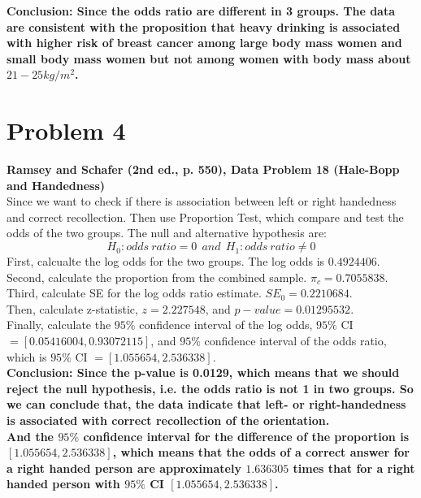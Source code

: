 \documentclass[10pt,letterpaper]{article}
\begin{document}
\textbf{Conclusion: Since the odds ratio are different in 3 groups. The data are consistent with the proposition that heavy drinking is associated with higher risk of breast cancer among large body mass women and small body mass women but not among women with body mass about $21-25 kg/m^2$.}

\section*{Problem 4}
\textbf{Ramsey and Schafer (2nd ed., p. 550), Data Problem 18 (Hale-Bopp and Handedness)}\\

Since we want to check if there is association between left or right handedness and correct recollection. Then use Proportion Test, which compare and test the odds of the two groups. The null and alternative hypothesis are:
\[H_0: odds \ ratio=0 ~~and~~H_1: odds \ ratio\neq 0 \] 
First, calcualte the log odds for the two groups. The log odds is $0.4924406$.\\
Second, calculate the proportion from the combined sample. $\pi_c=0.7055838$.\\
Third, calculate SE for the log odds ratio estimate. ${SE}_0=0.2210684$.\\
Then, calculate z-statistic, $z=2.227548$, and $p-value=0.01295532$.\\
Finally, calculate the $95\%$ confidence interval of the log odds, $95\%$ CI $= [0.05416004 , 0.93072115]$, and $95\%$ confidence interval of the odds ratio, which is $95\%$ CI $= [1.055654 , 2.536338]$.\\

\textbf{Conclusion: Since the p-value is 0.0129, which means that we should reject the null hypothesis, i.e. the odds ratio is not 1 in two groups.  So we can conclude that, the data indicate that left- or right-handedness is associated with correct recollection of the orientation. \\
And the $95\%$ confidence interval for the difference of the proportion is $[1.055654 , 2.536338]$, which means that the odds
of a correct answer for a right handed person are approximately $1.636305$ times that for a right handed person with $95\%$ CI $[1.055654 , 2.536338]$. }
\end{document}
